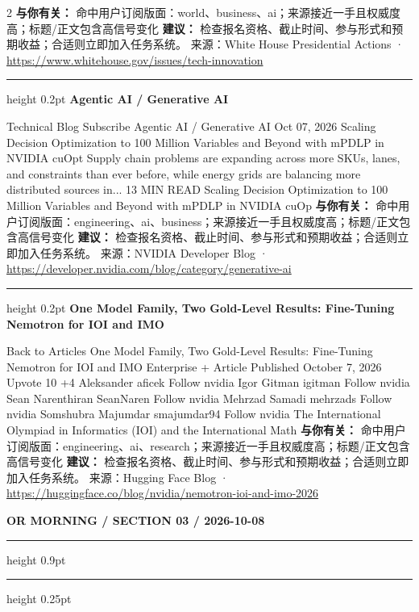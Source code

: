 \documentclass[10.5pt]{ctexart}
\begin{document}
\begin{multicols}{2}
\textbf{与你有关：} 命中用户订阅版面：world、business、ai；来源接近一手且权威度高；标题/正文包含高信号变化
\textbf{建议：} 检查报名资格、截止时间、参与形式和预期收益；合适则立即加入任务系统。
{\footnotesize\color{ormuted} 来源：White House Presidential Actions · \url{https://www.whitehouse.gov/issues/tech-innovation}}
\vspace{2mm}
\hrule height 0.2pt
\vspace{2mm}
{\large\bfseries Agentic AI / Generative AI}\par
Technical Blog Subscribe Agentic AI / Generative AI Oct 07, 2026 Scaling Decision Optimization to 100 Million Variables and Beyond with mPDLP in NVIDIA cuOpt Supply chain problems are expanding across more SKUs, lanes, and constraints than ever before, while energy grids are balancing more distributed sources in... 13 MIN READ Scaling Decision Optimization to 100 Million Variables and Beyond with mPDLP in NVIDIA cuOp
\textbf{与你有关：} 命中用户订阅版面：engineering、ai、business；来源接近一手且权威度高；标题/正文包含高信号变化
\textbf{建议：} 检查报名资格、截止时间、参与形式和预期收益；合适则立即加入任务系统。
{\footnotesize\color{ormuted} 来源：NVIDIA Developer Blog · \url{https://developer.nvidia.com/blog/category/generative-ai}}
\vspace{2mm}
\hrule height 0.2pt
\vspace{2mm}
{\large\bfseries One Model Family, Two Gold-Level Results: Fine-Tuning Nemotron for IOI and IMO}\par
Back to Articles One Model Family, Two Gold-Level Results: Fine-Tuning Nemotron for IOI and IMO Enterprise + Article Published October 7, 2026 Upvote 10 +4 Aleksander aficek Follow nvidia Igor Gitman igitman Follow nvidia Sean Narenthiran SeanNaren Follow nvidia Mehrzad Samadi mehrzads Follow nvidia Somshubra Majumdar smajumdar94 Follow nvidia The International Olympiad in Informatics (IOI) and the International Math
\textbf{与你有关：} 命中用户订阅版面：engineering、ai、research；来源接近一手且权威度高；标题/正文包含高信号变化
\textbf{建议：} 检查报名资格、截止时间、参与形式和预期收益；合适则立即加入任务系统。
{\footnotesize\color{ormuted} 来源：Hugging Face Blog · \url{https://huggingface.co/blog/nvidia/nemotron-ioi-and-imo-2026}}
\end{multicols}
\newpage
{\small\bfseries OR MORNING / SECTION 03 / 2026-10-08}
\vspace{2mm}
\hrule height 0.9pt
\vspace{1.5mm}
\hrule height 0.25pt
\vspace{4mm}
\end{document}

